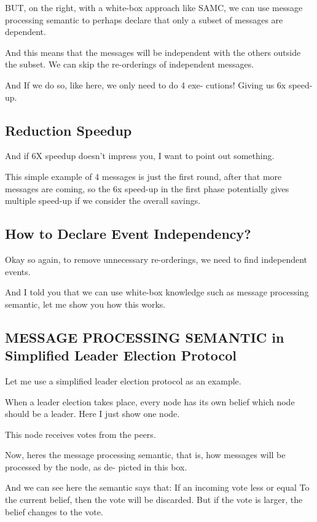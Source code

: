 BUT, on the right, with a white-box approach like SAMC, we can use message
processing semantic to perhaps declare that only a subset of messages are
dependent.

And this means that the messages will be independent with the others outside the
subset. We can skip the re-orderings of independent messages.

And If we do so, like here, we only need to do 4 exe- cutions! Giving us 6x
speed-up.

\subsection{Reduction Speedup}

And if 6X speedup doesn't impress you, I want to point out something.

This simple example of 4 messages is just the first round, after that more
messages are coming, so the 6x speed-up in the first phase potentially gives
multiple speed-up if we consider the overall savings.

\subsection{How to Declare Event Independency?}

Okay so again, to remove unnecessary re-orderings, we need to find independent
events.

And I told you that we can use white-box knowledge such as message processing
semantic, let me show you how this works.

\subsection{MESSAGE PROCESSING SEMANTIC in Simplified Leader Election Protocol}

Let me use a simplified leader election protocol as an example.

When a leader election takes place, every node has its own belief which node
should be a leader. Here I just show one node.

This node receives votes from the peers.

Now, heres the message processing semantic, that is, how messages will be
processed by the node, as de- picted in this box.

And we can see here the semantic says that: If an incoming vote less or equal
To the current belief, then the vote will be discarded. But if the vote is
larger, the belief changes to the vote.

